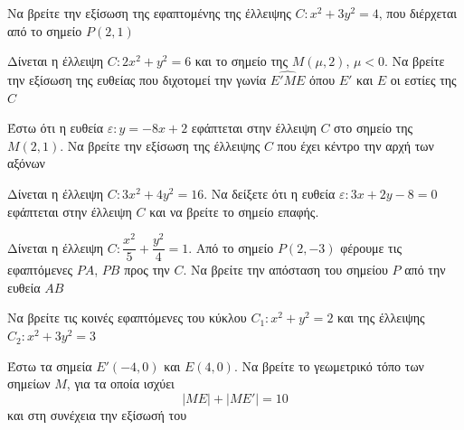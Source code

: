 \documentclass{presentation}
\begin{document}
\begin{askisi}
  Να βρείτε την εξίσωση της εφαπτομένης της έλλειψης $C:x^2+3y^2=4$, που διέρχεται από το σημείο $Ρ(2,1)$


\end{askisi}

\begin{askisi}
  Δίνεται η έλλειψη $C:2x^2+y^2=6$ και το σημείο της $Μ(μ,2)$, $μ<0$. Να βρείτε την εξίσωση της ευθείας που διχοτομεί την γωνία $\widehat{Ε'ΜΕ}$ όπου $Ε'$ και $Ε$ οι εστίες της $C$


\end{askisi}

\begin{askisi}
  Έστω ότι η ευθεία $ε:y=-8x+2$ εφάπτεται στην έλλειψη $C$ στο σημείο της $Μ(2,1)$. Να βρείτε την εξίσωση της έλλειψης $C$ που έχει κέντρο την αρχή των αξόνων


\end{askisi}

\begin{askisi}
  Δίνεται η έλλειψη $C:3x^2+4y^2=16$. Να δείξετε ότι η ευθεία $ε:3x+2y-8=0$ εφάπτεται στην έλλειψη $C$ και να βρείτε το σημείο επαφής.


\end{askisi}

\begin{askisi}
  Δίνεται η έλλειψη $C:\dfrac{x^2}{5}+\dfrac{y^2}{4}=1$. Από το σημείο $Ρ(2,-3)$ φέρουμε τις εφαπτόμενες $ΡΑ$, $ΡΒ$ προς την $C$. Να βρείτε την απόσταση του σημείου $Ρ$ από την ευθεία $ΑΒ$


\end{askisi}

\begin{askisi}
  Να βρείτε τις κοινές εφαπτόμενες του κύκλου $C_1:x^2+y^2=2$ και της έλλειψης $C_2:x^2+3y^2=3$


\end{askisi}

\begin{askisi}
  Έστω τα σημεία $Ε'(-4,0)$ και $Ε(4,0)$. Να βρείτε το γεωμετρικό τόπο των σημείων $Μ$, για τα οποία ισχύει
  $$|ΜΕ|+|ΜΕ'|=10$$
  και στη συνέχεια την εξίσωσή του


\end{askisi}
\end{document}
